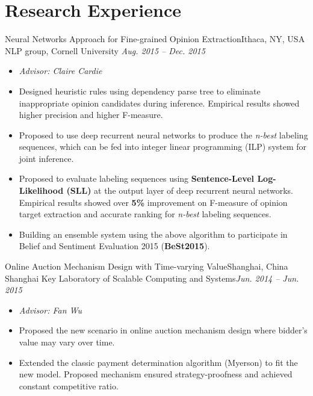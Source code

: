 \documentclass[letterpaper,12pt]{resume}
\begin{document}
\section{Research Experience}
\begin{itemize}
 
   \credential
     {Neural Networks Approach for Fine-grained Opinion Extraction}{Ithaca, NY, USA}
    {NLP group, Cornell University}
    {\textit{Aug. 2015 -- Dec. 2015}}
    {
    \begin{itemize}
     \item{ \textit{Advisor: Claire Cardie}}
    
    \item{Designed heuristic rules using dependency parse tree to eliminate inappropriate opinion candidates during inference. Empirical results showed higher precision and higher F-measure.}
    
    \item{Proposed to use deep recurrent neural networks to produce the \textit{n-best} labeling sequences, which can be fed into integer linear programming (ILP) system for joint inference.}
    
	 \item{Proposed to evaluate labeling sequences using \textbf{Sentence-Level Log-Likelihood (SLL)} at the output layer of deep recurrent neural networks. Empirical results showed over \textbf{5\%} improvement on F-measure of opinion target extraction and accurate  ranking for \textit{n-best} labeling sequences. }%
	 
	 \item{ Building an ensemble system using the above algorithm to participate in Belief and Sentiment Evaluation 2015 (\textbf{BeSt2015}).}
	 
	
    \end{itemize}
    }
    
      \credential
    {Online Auction Mechanism Design with Time-varying Value}{Shanghai, China}
    {Shanghai Key Laboratory of Scalable Computing and Systems}{\textit{Jun. 2014 -- Jun. 2015}}
    {
    \begin{itemize}
    \item{ \textit{Advisor: Fan Wu}}
     \item{ Proposed the new scenario in online auction mechanism design where bidder's value may vary over time.}
      \item{
	Extended the classic payment determination algorithm (Myerson) to fit the new model. Proposed mechanism ensured strategy-proofness and achieved constant competitive ratio. 
        }
  

\end{itemize}}
\end{itemize}
\end{document}
